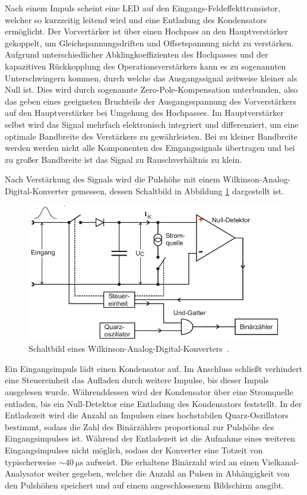 Nach einem Impuls scheint eine LED auf den Eingangs-Feldeffekttransistor, welcher so kurzzeitig
leitend wird und eine Entladung des Kondensators ermöglicht.
Der Vorvertärker ist über einen Hochpass an den Hauptverstärker gekoppelt, um Gleichspannungsdriften
und Offsetspannung nicht zu verstärken. Aufgrund unterschiedlicher Abklingkoeffizienten des
Hochpasses und der kapazitiven Rückkopplung des Operationsverstärkers kann es zu sogenannten
Unterschwingern kommen, durch welche das Ausgangssignal zeitweise kleiner als Null ist. Dies
wird durch sogenannte Zero-Pole-Kompensation unterbunden, also das geben eines geeigneten
Bruchteils der Ausgangsspannung des Vorverstärkers auf den Hauptverstärker bei Umgehung
des Hochpasses.
Im Hauptverstärker selbst wird das Signal mehrfach elektronisch integriert und differenziert,
um eine optimale Bandbreite des Verstärkers zu gewährleisten. Bei zu kleiner Bandbreite werden
werden nicht alle Komponenten des Eingangssignals übertragen und bei zu großer Bandbreite
ist das Signal zu Rauschverhältnis zu klein.

Nach Verstärkung des Signals wird die Pulshöhe mit einem Wilkinson-Analog-Digital-Konverter
gemessen, dessen Schaltbild in Abbildung \ref{fig:Wilkinson-Analog-Digital-Konverter} dargestellt ist.
\begin{figure}
	\centering
	\includegraphics[width=.8\textwidth]{images/Wilkinson-AD-Konverter.pdf}
	\caption{Schaltbild eines Wilkinson-Analog-Digital-Konverters~\cite[21]{anleitung}.}
	\label{fig:Wilkinson-Analog-Digital-Konverter}
\end{figure}
Ein Eingangsimpuls lädt einen Kondensator auf. Im Anschluss schließt verhindert eine Steuereinheit
das Aufladen durch weitere Impulse, bis dieser Impuls ausgelesen wurde.
Währenddessen wird der Kondensator über eine Stromquelle entladen, bis ein Null-Detektor eine
Entladung des Kondensators feststellt. In der Entladezeit wird die Anzahl an Impulsen eines
hochstabilen Quarz-Oszillators bestimmt, sodass die Zahl des Binärzählers proportional zur
Pulshöhe des Eingangsimpulses ist.
Während der Entladezeit ist die Aufnahme eines weiteren Eingangsimpulses nicht möglich,
sodass der Konverter eine Totzeit von typischerweise $\sim \SI{40}{\micro\second}$ aufweist.
Die erhaltene Binärzahl wird an einen Vielkanal-Analysator weiter gegeben, welcher
die Anzahl an Pulsen in Abhängigkeit von den Pulshöhen speichert und auf einem angeschlossenem
Bildschirm ausgibt.

